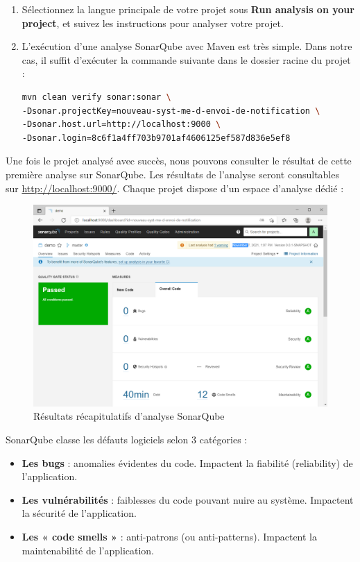 \begin{enumerate}
\begin{enumerate}
        \item Sélectionnez la langue principale de votre projet sous \textbf{Run analysis on your project}, et suivez les instructions pour analyser votre projet. 
        \item L'exécution d'une analyse SonarQube avec Maven est très simple. Dans notre cas, il suffit d'exécuter la commande suivante dans le dossier racine du projet :
\begin{lstlisting}[numbers=none,language=bash, deletekeywords={login}]
mvn clean verify sonar:sonar \
-Dsonar.projectKey=nouveau-syst-me-d-envoi-de-notification \
-Dsonar.host.url=http://localhost:9000 \
-Dsonar.login=8c6f1a4ff703b9701af4606125ef587d836e5ef8
\end{lstlisting} 
\end{enumerate}
\end{enumerate}
Une fois le projet analysé avec succès, nous pouvons consulter le résultat de cette première analyse sur SonarQube. Les résultats de l’analyse seront consultables sur \url{http://localhost:9000/}. Chaque projet dispose d’un espace d’analyse dédié :
\begin{figure}[H]
    \begin{center}
        \includegraphics[width=\linewidth]{images/sec5/sonar-2.png}
        \caption{Résultats récapitulatifs d'analyse SonarQube}
        \label{fig:sonar-2}
    \end{center} 
\end{figure}
SonarQube classe les défauts logiciels selon 3 catégories :
\begin{itemize}
    \item \textbf{Les bugs} : anomalies évidentes du code. Impactent la fiabilité (reliability) de l’application.
    \item \textbf{Les vulnérabilités} : faiblesses du code pouvant nuire au système. Impactent la sécurité de l’application.
    \item \textbf{Les « code smells »} : anti-patrons (ou anti-patterns). Impactent la maintenabilité de l’application.
\end{itemize}

